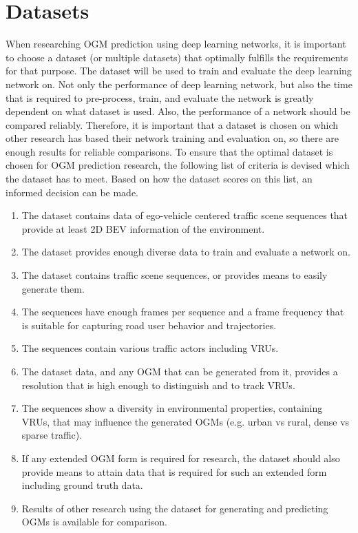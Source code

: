 \section{Datasets} \label{sec:datasets}

When researching \gls{OGM} prediction using deep learning networks, it is important to choose a dataset (or multiple datasets) that optimally fulfills the requirements for that purpose. The dataset will be used to train and evaluate the deep learning network on. Not only the performance of deep learning network, but also the time that is required to pre-process, train, and evaluate the network is greatly dependent on what dataset is used. Also, the performance of a network should be compared reliably. Therefore, it is important that a dataset is chosen on which other research has based their network training and evaluation on, so there are enough results for reliable comparisons. To ensure that the optimal dataset is chosen for \gls{OGM} prediction research, the following list of criteria is devised which the dataset has to meet. Based on how the dataset scores on this list, an informed decision can be made. 


\begin{enumerate}
	\item The dataset contains data of ego-vehicle centered traffic scene sequences that provide at least 2D \gls{BEV} information of the environment.
	\item The dataset provides enough diverse data to train and evaluate a network on.
	\item The dataset contains traffic scene sequences, or provides means to easily generate them.
	\item The sequences have enough frames per sequence and a frame frequency that is suitable for capturing road user behavior and trajectories.
	\item The sequences contain various traffic actors including \glspl{VRU}.
	\item The dataset data, and any \gls{OGM} that can be generated from it, provides a resolution that is high enough to distinguish and to track \glspl{VRU}. 	
	\item The sequences show a diversity in environmental properties, containing \glspl{VRU}, that may influence the generated \glspl{OGM} (e.g. urban vs rural, dense vs sparse traffic).
	\item If any extended \gls{OGM} form is required for research, the dataset should also provide means to attain data that is required for such an extended form including ground truth data.
	\item Results of other research using the dataset for generating and predicting \glspl{OGM} is available for comparison. 
\end{enumerate}


